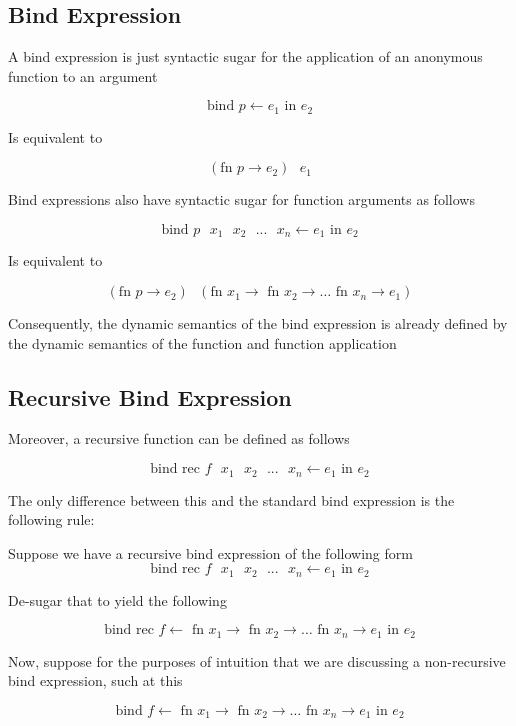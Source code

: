 \documentclass[titlepage]{article}
\begin{document}
\subsection{Bind Expression}
A bind expression is just syntactic sugar for the application of an anonymous function to an argument

$$\text{bind } p \leftarrow e_1 \text{ in } e_2$$

Is equivalent to

$$(\text{fn } p \rightarrow e_2) \text{ } e_1$$

Bind expressions also have syntactic sugar for function arguments as follows

$$\text{bind } p \text{ } x_1 \text{ } x_2 \text{ }... \text{ } x_n \leftarrow e_1 \text{ in } e_2$$

Is equivalent to

$$(\text{fn } p \rightarrow e_2) \text{ } (\text{fn } x_1 \rightarrow \text{ fn } x_2 \rightarrow \dots \text{ fn } x_n \rightarrow e_1)$$

Consequently, the dynamic semantics of the bind expression is already defined by the dynamic semantics of the function and function application

\subsection{Recursive Bind Expression}

Moreover, a recursive function can be defined as follows

$$\text{bind rec } f \text{ } x_1 \text{ } x_2 \text{ }... \text{ } x_n \leftarrow e_1 \text{ in } e_2$$

The only difference between this and the standard bind expression is the following rule:

Suppose we have a recursive bind expression of the following form
$$\text{bind rec } f \text{ } x_1 \text{ } x_2 \text{ }... \text{ } x_n \leftarrow e_1 \text{ in } e_2$$

De-sugar that to yield the following

$$\text{bind rec } f \leftarrow \text{ fn } x_1 \rightarrow \text{ fn } x_2 \rightarrow \dots \text{ fn } x_n \rightarrow e_1 \text{ in } e_2$$

Now, suppose for the purposes of intuition that we are discussing a non-recursive bind expression, such at this

$$\text{bind } f \leftarrow \text{ fn } x_1 \rightarrow \text{ fn } x_2 \rightarrow \dots \text{ fn } x_n \rightarrow e_1 \text{ in } e_2$$
\end{document}
